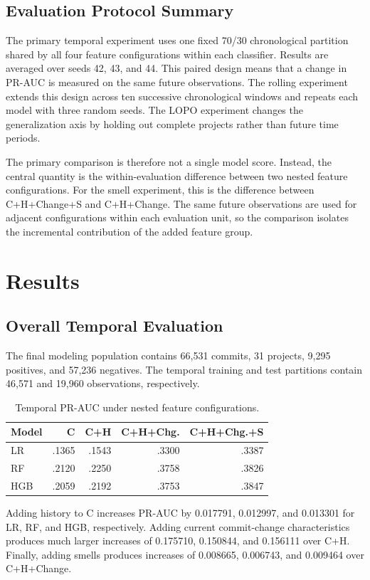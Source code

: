 \documentclass[conference]{IEEEtran}
\begin{document}
\subsection{Evaluation Protocol Summary}
The primary temporal experiment uses one fixed 70/30 chronological partition shared by all four feature configurations within each classifier. Results are averaged over seeds 42, 43, and 44. This paired design means that a change in PR-AUC is measured on the same future observations. The rolling experiment extends this design across ten successive chronological windows and repeats each model with three random seeds. The LOPO experiment changes the generalization axis by holding out complete projects rather than future time periods.

The primary comparison is therefore not a single model score. Instead, the central quantity is the within-evaluation difference between two nested feature configurations. For the smell experiment, this is the difference between C+H+Change+S and C+H+Change. The same future observations are used for adjacent configurations within each evaluation unit, so the comparison isolates the incremental contribution of the added feature group.

\section{Results}
\subsection{Overall Temporal Evaluation}
The final modeling population contains 66,531 commits, 31 projects, 9,295 positives, and 57,236 negatives. The temporal training and test partitions contain 46,571 and 19,960 observations, respectively.

\begin{table}[t]
\centering
\caption{Temporal PR-AUC under nested feature configurations.}
\label{tab:temporal}
\small
\begin{tabular}{lrrrr}
\toprule
Model & C & C+H & C+H+Chg. & C+H+Chg.+S\\
\midrule
LR & .1365 & .1543 & .3300 & .3387\\
RF & .2120 & .2250 & .3758 & .3826\\
HGB & .2059 & .2192 & .3753 & .3847\\
\bottomrule
\end{tabular}
\end{table}

Adding history to C increases PR-AUC by 0.017791, 0.012997, and 0.013301 for LR, RF, and HGB, respectively. Adding current commit-change characteristics produces much larger increases of 0.175710, 0.150844, and 0.156111 over C+H. Finally, adding smells produces increases of 0.008665, 0.006743, and 0.009464 over C+H+Change.
\end{document}
